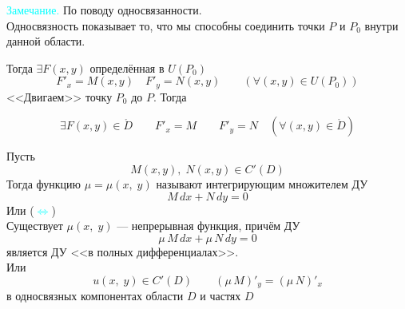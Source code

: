 \begin{Proof}
\begin{enumerate}
            \textcolor{cyan}{Замечание.} По поводу односвязанности.\\
            Односвязность показывает то, что мы способны соединить точки $P$ и $P_0$ внутри данной области.\\
            \begin{figure}[h!]
                \noindent{}
            \end{figure}
            Тогда $\exists F(x,y)$ определённая в $U(P_0)$
            \begin{equation*}
                F'_x=M(x,y) \quad F'_y=N(x,y) \qquad (\forall (x,y) \in U(P_0))
            \end{equation*}
            <<Двигаем>> точку $P_0$ до $P$. Тогда\\
            \pagebreak
            \begin{figure}[h!]
                \noindent{}
            \end{figure}
            \[
                \exists F(x,y) \in \mathring{D} \qquad  F'_x=M \qquad F'_y=N \quad (\forall (x,y) \in \mathring{D})
            \]
    \end{enumerate}
\end{Proof}

\begin{Def}
    Пусть 
    \[
        M(x,y),\; N(x,y) \in C'(D)
    \]
    Тогда функцию $\mu = \mu(x,\;y)$ называют интегрирующим множителем ДУ
    \[
        M\,dx + N\,dy=0
    \]
    Или (\textcolor{cyan}{$\Leftrightarrow$})\\
    Существует $\mu(x,\;y)$ --- непрерывная функция, причём ДУ\\
    \[
        \mu\,M\,dx+ \mu\,N\,dy = 0
    \] 
    является ДУ <<в полных дифференциалах>>.\\
    Или
    \[
        u(x,\;y) \in C'(D) \qquad (\mu\,M)'_y=(\mu\,N)'_x
    \]
    в односвязных компонентах области $D$ и частях $D$
\end{Def}



